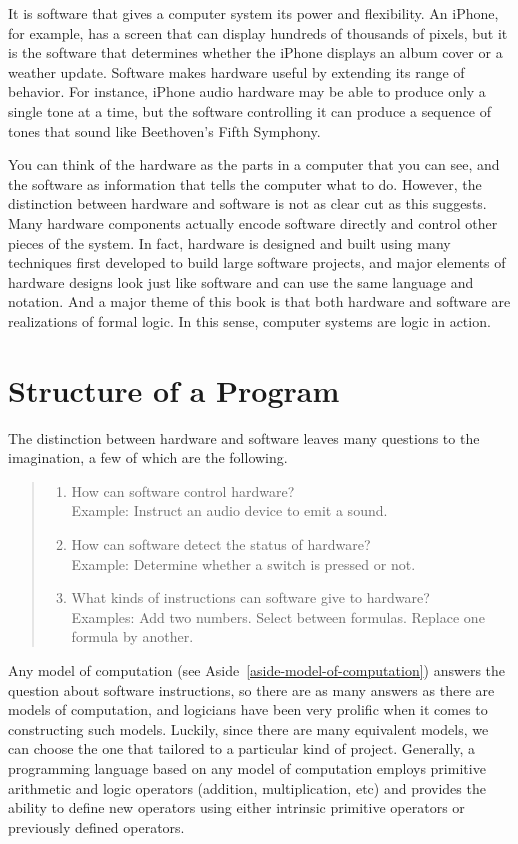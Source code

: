 It is software that gives a computer system its power and flexibility.
An iPhone, for example, has a screen that
can display hundreds of thousands of pixels,
but it is the software that determines whether the
iPhone displays an album cover or a weather update.
Software makes hardware useful by extending its range of behavior.
For instance, iPhone audio hardware may be able to produce
only a single tone at a time, but the software controlling it
can produce a sequence of tones
that sound like Beethoven's Fifth Symphony.

You can think of the hardware as
the parts in a computer that you can see,
and the software as information that tells the computer what to do.
However, the distinction between hardware and software is not as
clear cut as this suggests. Many hardware components actually
encode software directly and control other pieces of the system.
In fact, hardware is designed and built using many techniques
first developed to build large software projects,
and major elements of hardware designs look just like software
and can use the same language and notation.
And a major theme of this book
is that both hardware and software are realizations of formal logic.
In this sense, computer systems are logic in action.

\section{Structure of a Program}

The distinction between hardware and software
leaves many questions to the imagination, a few of which are the following.
\begin{quote}
\begin{enumerate}
\item How can software control hardware?\\
      Example: Instruct an audio device to emit a sound.
\item How can software detect the status of hardware?\\
      Example: Determine whether a switch is pressed or not.
\item What kinds of instructions can software give to hardware?\\
      Examples: Add two numbers. Select between formulas. Replace one formula by another.
\end{enumerate}
\end{quote}

Any model of computation (see Aside~\ref{aside-model-of-computation})
answers the question about software instructions,
so there are as many answers as there are
models of computation, and
logicians have been very prolific when it
comes to constructing such models.
Luckily, since there are many equivalent models,
we can choose the one
that tailored to a particular kind of project.
Generally, a programming language based on any model of computation
employs primitive arithmetic and logic operators
(addition, multiplication, etc)
and provides the ability to define new operators
using either intrinsic primitive operators or previously defined operators.

